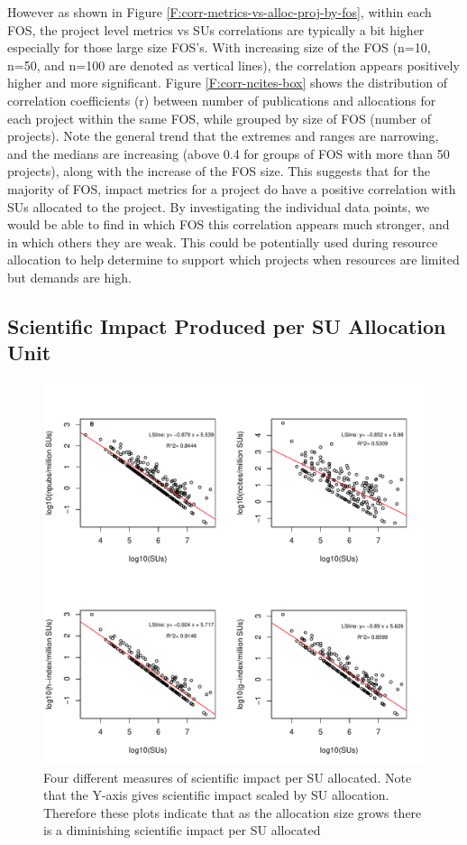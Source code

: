 \documentclass{tex/sig-alternate}
\begin{document}
However as shown in Figure \ref{F:corr-metrics-vs-alloc-proj-by-fos}, within each FOS, the project level metrics vs SUs correlations are typically a bit higher especially for those large size FOS's. With increasing size of the FOS (n=10, n=50, and n=100 are denoted as vertical lines), the correlation appears positively higher and more significant. Figure \ref{F:corr-ncites-box} shows the distribution of correlation coefficients (r) between number of publications and allocations for each project within the same FOS, while grouped by size of FOS (number of projects). Note the general trend that the extremes and ranges are narrowing, and the medians are increasing (above 0.4 for groups of FOS with more than 50 projects), along with the increase of the FOS size. This suggests that for the majority of FOS, impact metrics for a project do have a positive correlation with SUs allocated to the project. By investigating the individual data points, we would be able to find in which FOS this correlation appears much stronger, and in which others they are weak. This could be potentially used during resource allocation to help determine to support which projects when resources are limited but demands are high.

\subsection{Scientific Impact Produced per SU Allocation Unit} 

\begin{figure}[!htb] 
  \centering 
    \includegraphics[width=1.0\columnwidth]{images/09_roi_projs.pdf} 
  \caption{Four different measures of scientific impact per SU allocated.  Note that the Y-axis gives scientific impact scaled by SU allocation. Therefore these plots indicate that as the allocation size grows there is a diminishing scientific impact per SU allocated}\label{F:projs-roi} 
\end{figure} 
\end{document}
